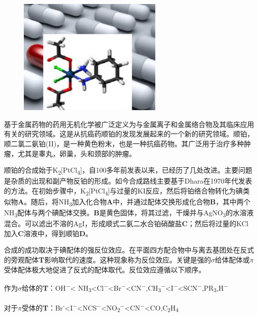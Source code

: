 \begin{figure}[h]
	\centering
	\includegraphics[width=7cm]{./pic/t14-1.png}
\end{figure}

基于金属药物的药用无机化学被广泛定义为与金属离子和金属络合物及其临床应用有关的研究领域。这是从抗癌药顺铂的发现发展起来的一个新的研究领域。顺铂，顺二氯二氨铂(II)，是一种黄色粉末，也是一种抗癌药物。其广泛用于治疗多种肿瘤，尤其是睾丸，卵巢，头和颈部的肿瘤。

顺铂的合成始于K\textsubscript{2}[PtCl\textsubscript{4}]，自100多年前发表以来，已经历了几处改进。主要问题是杂质的出现和副产物反铂的形成。如今合成路线主要基于Dhara在1970年代发表的方法。在初始步骤中，K\textsubscript{2}[PtCl\textsubscript{4}]与过量的KI反应，然后将铂络合物转化为碘类似物\textbf{A}。随后，将NH\textsubscript{3}加入化合物\textbf{A}中，并通过配体交换形成化合物\textbf{B}，其中两个NH\textsubscript{3}配体与两个碘配体交换。\textbf{B}是黄色固体，将其过滤，干燥并与AgNO\textsubscript{3}的水溶液混合。可以滤出不溶的AgI，形成顺式二氨二水合铂硝酸盐\textbf{C}；然后将过量的KCl加入\textbf{C}溶液中，得到顺铂\textbf{D}。

合成的成功取决于碘配体的强反位效应。在平面四方配合物中与离去基团处在反式的旁观配体\textbf{T}影响取代的速度。这种现象称为反位效应。关键是强的$\sigma$给体配体或$\pi$受体配体极大地促进了反式的配体取代。反位效应遵循以下顺序。

作为$\sigma$给体的\textbf{T}：OH\textsuperscript{−}< NH\textsubscript{3}<Cl\textsuperscript{−}<Br\textsuperscript{−}<CN\textsuperscript{−},CH\textsubscript{3}\textsuperscript{−}<I\textsuperscript{−}<SCN\textsuperscript{−},PR\textsubscript{3},H\textsuperscript{−}

对于$\pi$受体的\textbf{T}：Br\textsuperscript{‑}<I\textsuperscript{−}<NCS\textsuperscript{−}<NO\textsubscript{2}\textsuperscript{−}<CN\textsuperscript{−}<CO,C\textsubscript{2}H\textsubscript{4}

